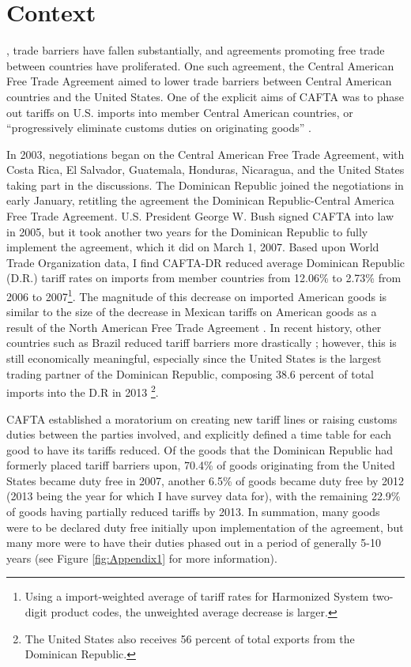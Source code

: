 \chapter{Context}
\label{sec:Context}

, trade barriers have fallen substantially, and agreements promoting
free trade between countries have proliferated. One such agreement, the Central American Free Trade 
Agreement aimed to lower trade barriers between Central American countries and 
the United States. One of the explicit aims of CAFTA was to phase out tariffs on U.S. 
imports into member Central American countries, or ``progressively eliminate customs duties on 
originating goods'' \citep{ustraderep}.

In 2003, negotiations began on the Central American Free Trade Agreement, with Costa Rica, El 
Salvador, Guatemala, Honduras, Nicaragua, and the United States taking part in the discussions. The 
Dominican Republic joined the negotiations in early January, retitling the agreement the Dominican 
Republic-Central America Free Trade Agreement. U.S. President George W. 
Bush signed CAFTA into law in 2005, but it took another two years for the 
Dominican Republic to fully implement the agreement, which it did on March 1, 2007.
Based upon World Trade Organization data,
I find CAFTA-DR reduced average Dominican 
Republic (D.R.) tariff rates on imports from member countries from 12.06\% to 2.73\% from 2006 to 
2007\footnote{Using a import-weighted average
of tariff rates for Harmonized System two-digit product codes, 
the unweighted average decrease is larger.}. The magnitude of this decrease on imported American
goods is similar to the size of the decrease in Mexican tariffs on American goods as a result of the
North American Free Trade Agreement \citep{goldberg}. 
In recent history, other countries such as Brazil reduced tariff barriers more drastically
\citep{kovak}; however, this is still economically meaningful, especially since the United States 
is the largest trading partner of the Dominican Republic, composing 
38.6 percent of  total imports into the D.R in 2013 \citep{wtocountry}\footnote{The 
United States also receives 56 percent of total exports from the Dominican Republic.}.

CAFTA established a moratorium on creating new tariff lines or raising customs 
duties between the parties involved, and explicitly defined a time table for each good to have its 
tariffs reduced. Of the goods that the Dominican Republic had formerly placed tariff barriers upon,
70.4\% of goods originating from the United States became duty free in 2007, another 6.5\%
of goods became duty free by 2012 (2013 being the year for which I have survey data for), with
the remaining 22.9\% of goods having partially reduced tariffs by 2013.
In summation, many goods were to be declared duty free initially upon implementation of the agreement, 
but many more were to have their duties phased out in a period of generally 5-10 years 
(see Figure \ref{fig:Appendix1} for more information). 

